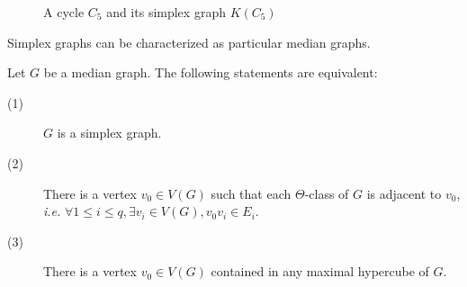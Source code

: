 \documentclass[a4paper,UKenglish,numberwithinsect,cleveref, autoref]{lipics-v2021}
\begin{document}
\begin{figure}[h]
\begin{subfigure}[b]{0.49\columnwidth}
\centering
\scalebox{0.7}{}
\end{subfigure}
\begin{subfigure}[b]{0.49\columnwidth}
\centering
\scalebox{0.7}{}
\end{subfigure}
\caption{A cycle $C_5$ and its simplex graph $K(C_5)$}
\label{fig:example_simplex}
\end{figure}

Simplex graphs can be characterized as particular median graphs.

\begin{theorem}
Let $G$ be a median graph. The following statements are equivalent:
\begin{description}
    \item[(1)] $G$ is a simplex graph.
    \item[(2)] There is a vertex $v_0 \in V(G)$ such that each $\Theta$-class of $G$ is adjacent to $v_0$, {\em i.e.} $\forall 1\le i\le q, \exists v_i\in V(G), v_0v_i \in E_i$.
    \item[(3)] There is a vertex $v_0 \in V(G)$ contained in any maximal hypercube of $G$.
\end{description}
\label{th:simplex}
\end{theorem}
\end{document}
